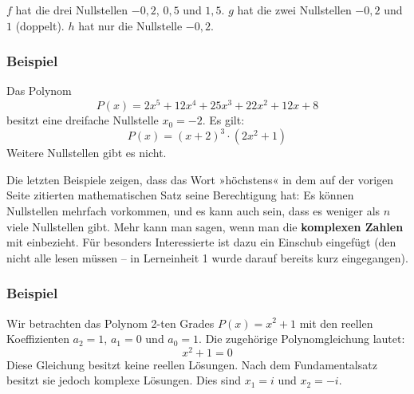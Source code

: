 $f$ hat die drei Nullstellen $-0{,}2$, $0{,}5$ und $1{,}5$. $g$ hat die zwei Nullstellen $-0{,}2$ und $1$ (doppelt). $h$ hat nur die Nullstelle $-0{,}2$.\beispielende

\subsubsection{Beispiel}

Das Polynom
\[ P(x) = 2x^5 + 12x^4 + 25x^3 + 22x^2 + 12x + 8 \]
besitzt eine dreifache Nullstelle $x_0 = -2$. Es gilt:
\[ P(x) = (x + 2)^3 \cdot (2x^2 + 1) \]
Weitere Nullstellen gibt es nicht.\beispielende

Die letzten Beispiele zeigen, dass das Wort »höchstens« in dem auf der vorigen Seite zitierten mathematischen Satz seine Berechtigung hat: Es können Nullstellen mehrfach vorkommen, und es kann auch sein, dass es weniger als $n$ viele Nullstellen gibt. Mehr kann man sagen, wenn man die \textbf{komplexen Zahlen} mit einbezieht. Für besonders Interessierte ist dazu ein Einschub eingefügt (den nicht alle lesen müssen -- in Lerneinheit 1 wurde darauf bereits kurz eingegangen).


\subsubsection{Beispiel}

Wir betrachten das Polynom 2-ten Grades $P(x) = x^2 + 1$ mit den reellen Koeffizienten $a_2 = 1$, $a_1 = 0$ und $a_0 = 1$. Die zugehörige Polynomgleichung lautet:
\[ x^2 + 1 = 0 \]
Diese Gleichung besitzt keine reellen Lösungen. Nach dem Fundamentalsatz besitzt sie jedoch komplexe Lösungen. Dies sind $x_1 = i$ und $x_2 = -i$.\beispielende

